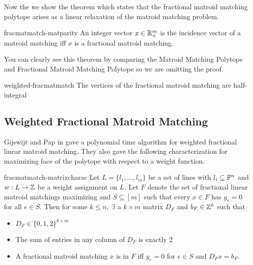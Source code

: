 Now the we show the theorem  which states that the fractional matroid matching polytope arises
as a linear relaxation of the matroid matching problem. 
\begin{Theorem}{\cite[Theoerm 2.1]{fraclinmat}}{fracmatmatch-matparity}
	An integer vector $x\in\mathbb{R}^{m}_+$ is the incidence  vector of a matroid matching iff $x$ is a fractional matroid matching. 
\end{Theorem}
You can clearly see this theorem by comparing the Matroid Matching Polytope and Fractional Matroid Matching Polytope so we are omitting the proof.
\begin{Theorem}{\cite[Theorem 1]{weightedfracmatmatch}}{weighted-fracmatmatch}
	The vertices of the fractional matroid matching are half-integral
\end{Theorem}
\subsection{Weighted Fractional Matroid Matching}
Gijswijt and Pap in \cite{weightedfracmatmatch} gave a polynomial time algorithm for weighted fractional linear matroid matching. They also gave the following characterization for maximizing face of the polytope with respect to a weight function.
\begin{Theorem}{\cite[Prood of Theorem 1]{weightedfracmatmatch}}{fracmatmatch-matrixcharac}
	Let $L=\{l_1,\dots, l_m\}$ be a set of lines with $l_i\subseteq \mathbb{F}^n$ and $w:L\to \mathbb{Z}$ be a weight assignment on $L$. Let $F$ denote the set of fractional linear matroid matchings maximizing and $S\subseteq [m]$ such that every $x\in F$ has $y_e=0$ for all $e\in S$. Then for some $k\leq n$, $\exists$ a $k\times m$ matrix $D_F$ and $b_F\in \mathbb{Z}^k$ such that \begin{itemize}
		\item $D_F\in\{0,1,2\}^{k\times m}$
		\item The sum of entries in any column of $D_F$ is exactly 2
		\item A fractional matroid matching $x$ is in $F$ iff $y_e=0$ for $e\in S$ and $D_Fx=b_F$.
	\end{itemize}
\end{Theorem}
